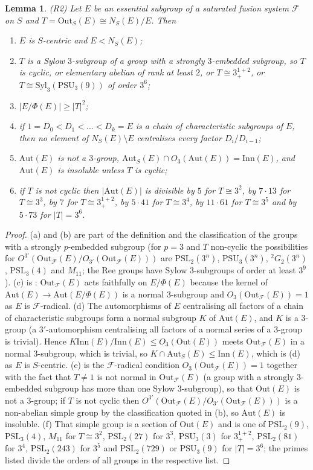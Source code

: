 \documentclass[11pt]{article}
\newtheorem{lemma}[theorem]{Lemma}
\theoremstyle{definition}
\theoremstyle{remark}
\newcommand{\F}{\mathcal{F}}
\newcommand{\Aut}{\mathrm{Aut}}
\newcommand{\Out}{\mathrm{Out}}
\newcommand{\Inn}{\mathrm{Inn}}
\newcommand{\Syl}{\mathrm{Syl}}
\newcommand{\PSL}{\mathrm{PSL}}
\newcommand{\PSU}{\mathrm{PSU}}
\newcommand{\Phifr}{\Phi}
\begin{document}
\begin{lemma}\label{lem:R2}
{\rm (R2)} Let $E$ be an essential subgroup of a saturated fusion system
$\F$ on $S$ and $T=\Out_S(E)\cong N_S(E)/E$.  Then
\begin{enumerate}
\item[(a)] $E$ is $S$-centric and $E<N_S(E)$;
\item[(b)] $T$ is a Sylow $3$-subgroup of a group with a strongly
  $3$-embedded subgroup, so $T$ is cyclic, or elementary abelian of rank at
  least $2$, or $T\cong 3^{1+2}_+$, or $T\cong\Syl_3(\PSU_3(9))$ of order
  $3^6$;
\item[(c)] $|E/\Phifr(E)|\ge |T|^2$;
\item[(d)] if $1=D_0<D_1<\dots<D_k=E$ is a chain of characteristic
  subgroups of $E$, then no element of $N_S(E)\setminus E$ centralises every
  factor $D_{i}/D_{i-1}$;
\item[(e)] $\Aut(E)$ is not a $3$-group, $\Aut_S(E)\cap O_3(\Aut(E))=\Inn(E)$,
  and $\Aut(E)$ is insoluble unless $T$ is cyclic;
\item[(f)] if $T$ is not cyclic then $|\Aut(E)|$ is divisible by $5$ for
  $T\cong 3^2$, by $7\cdot13$ for $T\cong3^3$, by $7$ for $T\cong3^{1+2}_+$,
  by $5\cdot41$ for $T\cong3^4$, by $11\cdot61$ for $T\cong3^5$ and by
  $5\cdot73$ for $|T|=3^6$.
\end{enumerate}
\end{lemma}
\begin{proof}
(a) and (b) are part of the definition and the classification of the
groups with a strongly $p$-embedded subgroup (for $p=3$ and $T$ non-cyclic
the possibilities for $O^{3'}(\Out_\F(E)/O_{3'}(\Out_\F(E)))$ are
$\PSL_2(3^n)$, $\PSU_3(3^n)$, ${}^2G_2(3^n)$, $\PSL_3(4)$ and $M_{11}$; the
Ree groups have Sylow $3$-subgroups of order at least $3^9$).  (c) is
\cite[Lemma 2.?]{PS}: $\Out_\F(E)$ acts faithfully on $E/\Phifr(E)$ because
the kernel of $\Aut(E)\to\Aut(E/\Phifr(E))$ is a normal $3$-subgroup and
$O_3(\Out_\F(E))=1$ as $E$ is $\F$-radical.  (d) The automorphisms of $E$
centralising all factors of a chain of characteristic subgroups form a
normal subgroup $K$ of $\Aut(E)$, and $K$ is a $3$-group (a $3'$-automorphism
centralising all factors of a normal series of a $3$-group is trivial).
Hence $K\Inn(E)/\Inn(E)\le O_3(\Out(E))$ meets $\Out_\F(E)$ in a normal
$3$-subgroup, which is trivial, so $K\cap\Aut_S(E)\le\Inn(E)$, which is
(d) as $E$ is $S$-centric.  (e) is the $\F$-radical condition
$O_3(\Out_\F(E))=1$ together with the fact that $T\ne1$ is not normal in
$\Out_\F(E)$ (a group with a strongly $3$-embedded subgroup has more than
one Sylow $3$-subgroup), so that $\Out(E)$ is not a $3$-group; if $T$ is not
cyclic then $O^{3'}(\Out_\F(E)/O_{3'}(\Out_\F(E)))$ is a non-abelian simple
group by the classification quoted in (b), so $\Aut(E)$ is insoluble.
(f) That simple group is a section of $\Out(E)$ and is one of $\PSL_2(9)$,
$\PSL_3(4)$, $M_{11}$ for $T\cong3^2$, $\PSL_2(27)$ for $3^3$,
$\PSU_3(3)$ for $3^{1+2}_+$, $\PSL_2(81)$ for $3^4$, $\PSL_2(243)$ for
$3^5$ and $\PSL_2(729)$ or $\PSU_3(9)$ for $|T|=3^6$; the primes listed
divide the orders of all groups in the respective list.
\end{proof}
\end{document}
